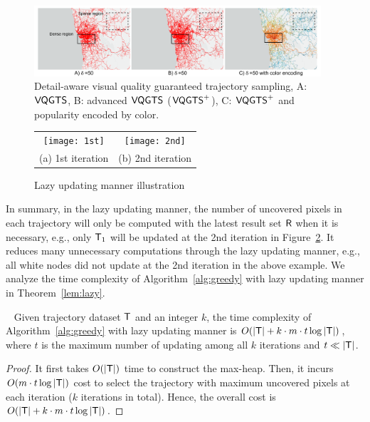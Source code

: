 \begin{figure}[t]
	\centering
	\includegraphics[width=0.95\textwidth]{pictures/problemsolveing/delta_motivation.pdf}
	\caption{Detail-aware visual quality guaranteed trajectory sampling, A: $\mathsf{VQGTS}{}$, B: advanced $\mathsf{VQGTS}$ ($\mathsf{VQGTS}^{+}$), C: $\mathsf{VQGTS}^{+}$ and popularity encoded by color.}
	\label{fig:delta}
\end{figure}


\begin{figure}
 \centering
 \small
 \begin{tabular}{cc}
   \texttt{[image: 1st]}
   &
   \texttt{[image: 2nd]}
   \\
   (a) 1st iteration
   &
   (b) 2nd iteration
 \end{tabular}
 \caption{Lazy updating manner illustration}
 \label{fig:heap}
\end{figure}



In summary, in the lazy updating manner, the number of uncovered pixels in each trajectory will only be computed with the latest result set $\mathsf{R}$ when it is necessary,
e.g., only $\mathsf{T}_1$ will be updated at the 2nd iteration in Figure~\ref{fig:heap}.
It reduces many unnecessary computations through the lazy updating manner, e.g., all white nodes did not update at the 2nd iteration in the above example.
We analyze the time complexity of Algorithm~\ref{alg:greedy} with lazy updating manner in Theorem~\ref{lem:lazy}.

\begin{lemma}~\label{lem:lazy}
Given trajectory dataset $\mathsf{T}$ and an integer $k$, the time complexity of Algorithm~\ref{alg:greedy} with lazy updating manner is $O(|\mathsf{T}| + k \cdot m \cdot t \log |\mathsf{T}|)$, where $t$ is the maximum number of updating among all $k$ iterations and $t \ll |\mathsf{T}|$.
\end{lemma}

\begin{proof}
It first takes $O(|\mathsf{T}|)$ time to construct the max-heap.
Then, it incurs $O( m \cdot t \log |\mathsf{T}|)$ cost to select the trajectory with maximum uncovered pixels at each iteration ($k$ iterations in total).
Hence, the overall cost is $O(|\mathsf{T}| + k \cdot m \cdot t \log |\mathsf{T}|)$.
\end{proof}


